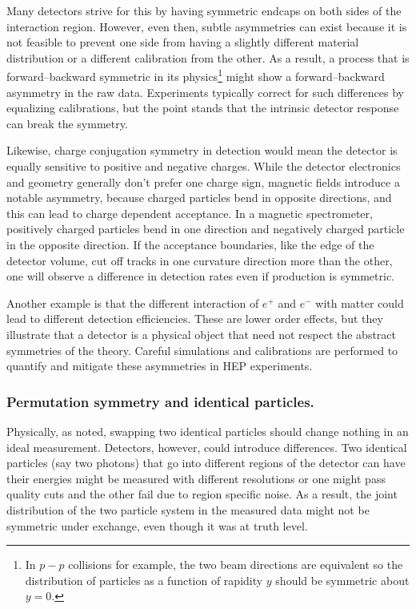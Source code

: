             Many detectors strive for this by having symmetric endcaps on both sides of the interaction region.
            However, even then, subtle asymmetries can exist because it is not feasible to prevent one side from having a slightly different material distribution or a different calibration from the other.
            As a result, a process that is forward--backward symmetric in its physics\footnote{In $p-p$ collisions for example, the two beam directions are equivalent so the distribution of particles as a function of rapidity $y$ should be symmetric about $y=0$.} might show a forward--backward asymmetry in the raw data.
            Experiments typically correct for such differences by equalizing calibrations, but the point stands that the intrinsic detector response can break the symmetry.
            
            Likewise, charge conjugation symmetry in detection would mean the detector is equally sensitive to positive and negative charges.
            While the detector electronics and geometry generally don’t prefer one charge sign, magnetic fields introduce a notable asymmetry, because charged particles bend in opposite directions, and this can lead to charge dependent acceptance.
            In a magnetic spectrometer, positively charged particles bend in one direction and negatively charged particle in the opposite direction.
            If the acceptance boundaries, like the edge of the detector volume, cut off tracks in one curvature direction more than the other, one will observe a difference in detection rates even if production is symmetric.
            
            Another example is that the different interaction of $e^+$ and $e^-$ with matter could lead to different detection efficiencies.
            These are lower order effects, but they illustrate that a detector is a physical object that need not respect the abstract symmetries of the theory.
            Careful simulations and calibrations are performed to quantify and mitigate these asymmetries in HEP experiments.

        \subsubsection{Permutation symmetry and identical particles.}

            Physically, as noted, swapping two identical particles should change nothing in an ideal measurement.
            Detectors, however, could introduce differences.
            Two identical particles (say two photons) that go into different regions of the detector can have their energies might be measured with different resolutions or one might pass quality cuts and the other fail due to region specific noise. 
            As a result, the joint distribution of the two particle system in the measured data might not be symmetric under exchange, even though it was at truth level.
            
